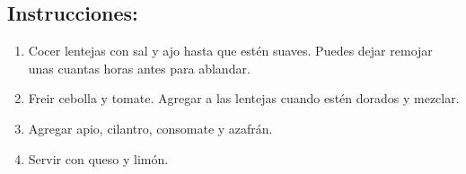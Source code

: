 \documentclass[a4paper]{article}
\begin{document}
	\subsection{Instrucciones:}
	\begin{enumerate}
		\item Cocer lentejas con sal y ajo hasta que estén suaves.
			Puedes dejar remojar unas cuantas horas antes para ablandar.
		\item Freir cebolla y tomate.
			Agregar a las lentejas cuando estén dorados y mezclar.
		\item Agregar apio, cilantro, consomate y azafrán.
		\item Servir con queso y limón.
	\end{enumerate}
\end{document}
